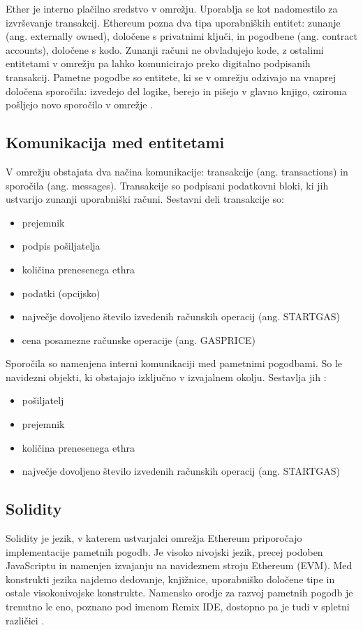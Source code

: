 \documentclass[a4paper, 12pt]{book}
\begin{document}
Ether je interno plačilno sredstvo v omrežju.
Uporablja se kot nadomestilo za izvrševanje transakcij.
Ethereum pozna dva tipa uporabniških entitet: zunanje (ang. externally owned), določene s privatnimi ključi, in pogodbene (ang. contract accounts), določene s kodo.
Zunanji računi ne obvladujejo kode, z ostalimi entitetami v omrežju pa lahko komunicirajo preko digitalno podpisanih transakcij.
Pametne pogodbe so entitete, ki se v omrežju odzivajo na vnaprej določena sporočila: izvedejo del logike, berejo in pišejo v glavno knjigo, oziroma pošljejo novo sporočilo v omrežje \cite{ethereumWhitepaper}.

\subsection{Komunikacija med entitetami}
V omrežju obstajata dva načina komunikacije: transakcije (ang. transactions) in sporočila (ang. messages).
Transakcije so podpisani podatkovni bloki, ki jih ustvarijo zunanji uporabniški računi.
Sestavni deli transakcije so:
\begin{itemize}
	\item prejemnik
	\item podpis pošiljatelja
	\item količina prenesenega ethra
	\item podatki (opcijsko)
	\item največje dovoljeno število izvedenih računskih operacij (ang. STARTGAS)
	\item cena posamezne računske operacije (ang. GASPRICE)
\end{itemize}

Sporočila so namenjena interni komunikaciji med pametnimi pogodbami.
So le navidezni objekti, ki obstajajo izključno v izvajalnem okolju.
Sestavlja jih \cite{ethereumWhitepaper}:
\begin{itemize}
	\item pošiljatelj
	\item prejemnik
	\item količina prenesenega ethra
	\item največje dovoljeno število izvedenih računskih operacij (ang. STARTGAS)
\end{itemize}

\subsection{Solidity}
Solidity je jezik, v katerem ustvarjalci omrežja Ethereum priporočajo implementacije pametnih pogodb.
Je visoko nivojski jezik, precej podoben JavaScriptu in namenjen izvajanju na navideznem stroju Ethereum (EVM).
Med konstrukti jezika najdemo dedovanje, knjižnice, uporabniško določene tipe in ostale visokonivojske konstrukte.
Namensko orodje za razvoj pametnih pogodb je trenutno le eno, poznano pod imenom Remix IDE, dostopno pa je tudi v spletni različici \cite{solidityDocs}.
\end{document}
